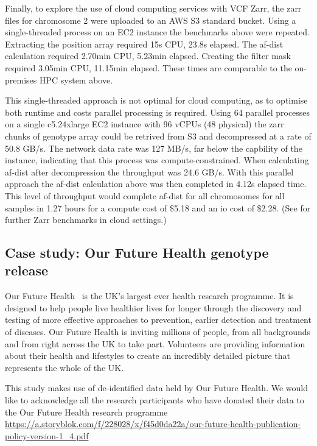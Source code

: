 \documentclass[a4paper,num-refs]{oup-contemporary}
\begin{document}
Finally, to explore the use of cloud computing services with VCF Zarr,
the zarr files for chromosome 2 were uploaded to an AWS S3 standard bucket.
Using a single-threaded process on an EC2 instance the benchmarks above were
repeated. Extracting the position array required 15s CPU, 23.8s elapsed.
The af-dist calculation required 2.70min CPU, 5.23min elapsed. Creating the filter mask
required 3.05min CPU, 11.15min elapsed. These times are comparable to the on-premises
HPC system above.

This single-threaded approach is not optimal for cloud computing, as to optimise
both runtime and costs parallel processing is required. Using 64 parallel processes
on a single c5.24xlarge EC2 instance with 96 vCPUs (48 physical) the zarr chunks of
genotype array could be retrived from S3 and decompressed at a rate of 50.8 GB/s.
The network data rate was 127 MB/s, far below the capbility of the instance,
indicating that this process was compute-constrained. When calculating af-dist after
decompression the throughput was 24.6 GB/s. With this parallel approach the 
af-dist calculation above was then completed in 4.12s elapsed time.
This level of throughput would complete af-dist for all chromosomes for all samples
in 1.27 hours for a compute cost of \$5.18 and an io cost of \$2.28.
(See \citep{durbin2020task,moore2021ome,gowan2022using} for further Zarr
benchmarks in cloud settings.)

\subsection{Case study: Our Future Health genotype release}
Our Future Health~\cite{ofhmain_2025} is the UK’s largest ever health research programme. 
It is designed to help people live healthier lives for longer through the 
discovery and testing of more effective approaches to prevention, earlier 
detection and treatment of diseases.
Our Future Health is inviting millions of people, from all backgrounds and 
from right across the UK to take part. Volunteers are providing information 
about their health and lifestyles to create an incredibly detailed picture 
that represents the whole of the UK. 

This study makes use of de-identified data held by Our Future Health. 
We would like to acknowledge all the research participants who have donated 
their data to the Our Future Health research programme 
\url{https://a.storyblok.com/f/228028/x/f45d0da22a/our-future-health-publication-policy-version-1_4.pdf}
\end{document}
